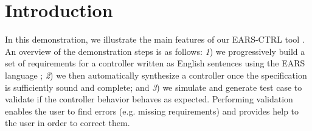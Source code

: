 \vspace{-1cm}
\section{Introduction}
\label{sec:intro}
\vspace{-.3cm}
In this demonstration, we illustrate the main features of our \textsf{EARS-CTRL}
tool \cite{EARSProject}.
An overview of the demonstration steps is as follows: \emph{1}) we
progressively build a set of requirements for a controller written as English
sentences using the EARS language \cite{EARS}; \emph{2}) we then automatically
synthesize a controller once the specification is sufficiently sound and
complete; and \emph{3}) we simulate and generate test case to
validate if the controller behavior behaves as expected.
Performing validation enables the user to find errors (e.g. missing
requirements) and provides help to the user in order to correct
them.